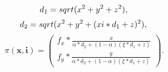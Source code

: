 \begin{equation}	
    d_1 = sqrt(x^2+y^2+z^2), \\
\end{equation}
\begin{equation}	
    d_2 = sqrt(x^2+y^2+(\\xi*d_1+z)^2 ), \\
\end{equation}
\begin{equation}	
    \pi(\mathbf{x}, \mathbf{i}) = \begin{pmatrix}f_x * \frac{x}{\alpha*d_2+(1-\alpha)(\xi*d_1+z)} \\
                                                 f_y * \frac{y}{\alpha*d_2+(1-\alpha)(\xi*d_1+z)} \end{pmatrix}.
    \label{eqn:ds}
\end{equation}




 